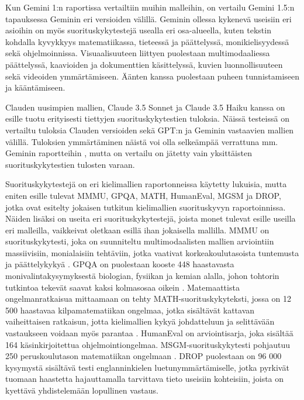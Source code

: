 Kun Gemini 1:n raportissa \parencite{googleDeepmindGeminiv1report} vertailtiin
muihin malleihin, on vertailu Gemini 1.5:n
\parencite{googleDeepmindGeminiv1report} tapauksessa Geminin eri versioiden
välillä. Geminin ollessa kykenevä useisiin eri asioihin on myös
suorituskykytestejä usealla eri osa-alueella, kuten tekstin kohdalla
kyvykkyys matematiikassa, tieteessä ja päättelyssä, monikielisyydessä
sekä ohjelmoinnissa. Visuaalisuuteen liittyen puolestaan multimodaaliessa
päättelyssä, kaavioiden ja dokumenttien käsittelyssä, kuvien luonnollisuuteen
sekä videoiden ymmärtämiseen. Äänten kanssa puolestaan puheen tunnistamiseen ja
kääntämiseen.

Clauden uusimpien mallien, Claude 3.5 Sonnet ja Claude 3.5 Haiku kanssa on
esille tuotu erityisesti tiettyjen suorituskykytestien tuloksia. Näissä
testeissä on vertailtu tuloksia Clauden versioiden sekä GPT:n ja Geminin
vastaavien mallien välillä. \parencite{anthropicClaudeSonnetAndHaiku35}
\parencite{anthropicClaudeSonnet} \parencite{anthropicClaudeHaiku} Tuloksien
ymmärtäminen näistä voi olla selkeämpää verrattuna mm. Geminin raportteihin
\parencite{googleDeepmindGeminiv1report}
\parencite{googleDeepmindGeminiv1_5report}, mutta on vertailu on jätetty vain
yksittäisten suorituskykytestien tulosten varaan.

Suorituskykytestejä on eri kielimallien raportonneissa
\parencite{anthropicClaudeSonnetAndHaiku35} \parencite{openAI2023GPT4}
\parencite{openAIGPT4o} \parencite{googleDeepmindGeminiv1_5report} käytetty
lukuisia, mutta eniten esille tulevat MMMU, GPQA, MATH, HumanEval, MGSM ja
DROP, jotka ovat esitelty jokaisen tutkitun kielimallien suorituskyvyn
raportoinnissa. Näiden lisäksi on useita eri suorituskykytestejä, joista monet
tulevat esille useilla eri malleilla, vaikkeivat oletkaan esillä ihan
jokaisella mallilla. MMMU on suorituskykytesti, joka on suunniteltu
multimodaalisten mallien arviointiin massiivisiin, monialaisiin tehtäviin,
jotka vaativat korkeakoulutasoista tuntemusta ja päättelykykyä
\parencite{benchmarkMMMU}. GPQA on puolestaan kooste 448 haastavasta
monivalintakysymyksestä biologian, fysiikan ja kemian alalla, johon tohtorin
tutkintoa tekevät saavat kaksi kolmasosaa oikein \parencite{benchmarkGPQA}.
Matemaattista ongelmanratkaisua mittaamaan on tehty MATH-suorituskykyteksti,
jossa on 12 500 haastavaa kilpamatematiikan ongelmaa, jotka sisältävät
kattavan vaiheittaisen ratkaisun, jotta kielimallien kykyä johdatteluun ja
selittävään vastaukseen voidaan myös parantaa \parencite{benchmarkMATH}.
HumanEval \parencite{benchmarkHumanEval} on arviointisarja, joka sisältää
164 käsinkirjoitettua ohjelmointiongelmaa. MSGM-suorituskykytesti pohjautuu
250 peruskoulutason matematiikan ongelmaan \parencite{benchmarkMSGM}. DROP
puolestaan on 96 000 kysymystä sisältävä testi englanninkielen
luetunymmärtämiselle, jotka pyrkivät tuomaan haastetta hajauttamalla
tarvittava tieto useisiin kohteisiin, joista on kyettävä yhdistelemään
lopullinen vastaus.

